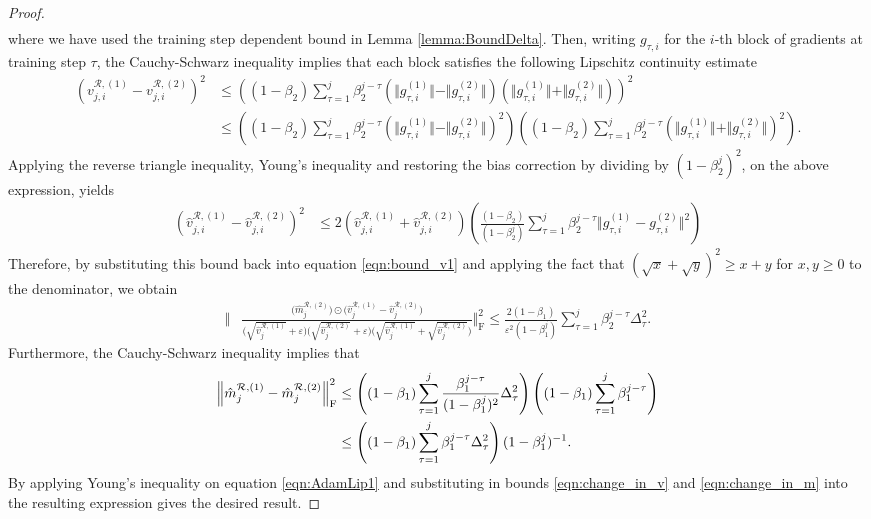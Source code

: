 \documentclass{article}
\begin{document}
\begin{appendices}
\begin{proof}
\begin{align}
\end{align}
  where we have used the training step dependent bound in Lemma \ref{lemma:BoundDelta}. Then, writing $g_{\tau,i}$ for the $i$-th block of gradients at training step $\tau$,  the Cauchy-Schwarz inequality implies that each block satisfies the following  Lipschitz continuity estimate
   \begin{align*}
         \left( v^{\mathcal R,(1)}_{j,i}- v^{\mathcal R,(2)}_{j,i}\right)^2 &\le \left((1-\beta_2)\sum_{\tau=1}^j\beta_2^{j-\tau}\left(\Vert g^{(1)}_{\tau,i}\Vert -\Vert g^{(2)}_{\tau,i}\Vert \right)\left(\Vert g^{(1)}_{\tau,i}\Vert+\Vert g^{(2)}_{\tau,i}\Vert\right)\right)^2\\
         &\le \left((1-\beta_2)\sum_{\tau=1}^j\beta_2^{j-\tau}(\Vert g^{(1)}_{\tau,i}\Vert -\Vert g^{(2)}_{\tau,i}\Vert)^2\right) \left( (1-\beta_2)\sum_{\tau=1}^j\beta_2^{j-\tau}(\Vert g^{(1)}_{\tau,i}\Vert+\Vert g^{(2)}_{\tau,i}\Vert)^2\right)
        . 
    \end{align*}
  Applying the reverse triangle inequality, Young's inequality and restoring the bias correction by dividing by $(1-\beta_2^j)^2$, on the above expression, yields
    \begin{align}\label{eqn:bound_v}
    \left( \hat v^{\mathcal R,(1)}_{j,i}- \hat v^{\mathcal R,(2)}_{j,i}\right)^2&\le  2\left(\hat v^{\mathcal R,(1)}_{j,i}+\hat v^{\mathcal R,(2)}_{j,i}\right) \left( \frac{(1-\beta_2)}{(1-\beta_2^j)}\sum_{\tau=1}^j\beta_2^{j-\tau}\Vert g^{(1)}_{\tau,i}-g^{(2)}_{\tau,i}\Vert^2\right)
   \end{align}
 Therefore, by substituting this bound back into equation \eqref{eqn:bound_v1} and applying the fact that $(\sqrt{x}+\sqrt{y})^2\ge x+y$ for $x,y\ge 0$ to the denominator, we obtain
 \begin{align}\label{eqn:change_in_v}
     \Bigg\Vert&\frac{\big(\hat m^{\mathcal R,(2)}_j\big) \odot\big( \hat v^{\mathcal R,(1)}_j-\hat v^{\mathcal R,(2)}_j\big)}{\big(\sqrt{\hat v^{\mathcal R,(1)}_j}+\varepsilon\big)\big(\sqrt{\hat v^{\mathcal R,(2)}_j}+\varepsilon\big)\big(\sqrt{\hat v^{\mathcal R,(1)}_j}+\sqrt{\hat v^{\mathcal R,(2)}_j}\big)}\Bigg\Vert^2_\mathrm{F}\le  \frac{2(1-\beta_1)}{\varepsilon^2(1-\beta_1^j)}\sum_{\tau=1}^j\beta_2^{j-\tau}\Delta^2_\tau.
 \end{align}
Furthermore, the Cauchy-Schwarz inequality implies that 
\begin{align}\label{eqn:change_in_m}
  \left\Vert \hat m^{\mathcal R,(1)}_j- \hat m^{\mathcal R,(2)}_j\right\Vert^2_\mathrm{F} &\le \left((1-\beta_1)\sum_{\tau=1}^j\frac{\beta_1^{j-\tau}}{(1-\beta_1^j)^2}\Delta_\tau^2 \right)\left((1-\beta_1)\sum_{\tau=1}^j \beta_1^{j-\tau}\right)\\& \le  \left((1-\beta_1)\sum_{\tau=1}^j\beta_1^{j-\tau}\Delta_\tau^2 \right)(1-\beta_1^j)^{-1}\notag.
\end{align}
By applying Young's inequality on equation \eqref{eqn:AdamLip1} and substituting in bounds \eqref{eqn:change_in_v} and \eqref{eqn:change_in_m} into the resulting expression gives the desired result.
\end{proof}

\end{appendices}

%
\end{document}
